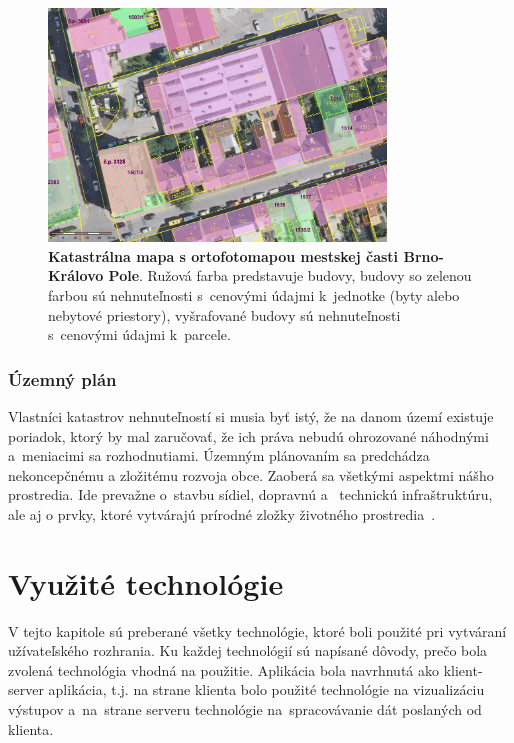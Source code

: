 \begin{figure}[ht]
    \centering
    \includegraphics[width=0.8\textwidth]{obrazky-figures/katastr-ortofo-kralovopole.jpg}
    \caption{\textbf{Katastrálna mapa s ortofotomapou mestskej časti Brno-Královo Pole}. Ružová farba predstavuje budovy, budovy so zelenou farbou sú nehnuteľnosti s~cenovými údajmi k~jednotke (byty alebo nebytové priestory), vyšrafované budovy sú nehnuteľnosti s~cenovými údajmi k~parcele.}
    \label{fig:katastrmapa}
\end{figure}

\subsection{Územný plán}
Vlastníci katastrov nehnuteľností si musia byť istý, že na danom území existuje poriadok, ktorý by mal zaručovať, že ich práva nebudú ohrozované náhodnými a~meniacimi sa rozhodnutiami. Územným plánovaním sa predchádza nekoncepčnému a zložitému rozvoja obce. Zaoberá sa všetkými aspektmi nášho prostredia. Ide prevažne o~stavbu sídiel, dopravnú a~ technickú infraštruktúru, ale aj o prvky, ktoré vytvárajú prírodné zložky životného prostredia~\cite{uzemnyplan}.



\chapter{Využité technológie}
\label{technology}
V tejto kapitole sú preberané všetky technológie, ktoré boli použité pri vytváraní užívateľského rozhrania. Ku každej technológií sú napísané dôvody, prečo bola zvolená technológia vhodná na použitie. Aplikácia bola navrhnutá ako klient-server aplikácia, t.j. na strane klienta bolo použité technológie na vizualizáciu výstupov a~na~strane serveru technológie na~spracovávanie dát poslaných od klienta.



